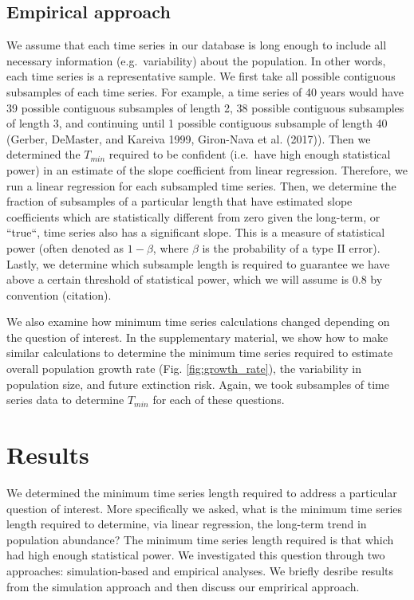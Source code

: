 \documentclass[12pt,]{article}
\begin{document}
\subsection{Empirical approach}\label{empirical-approach}

We assume that each time series in our database is long enough to
include all necessary information (e.g.~variability) about the
population. In other words, each time series is a representative sample.
We first take all possible contiguous subsamples of each time series.
For example, a time series of 40 years would have 39 possible contiguous
subsamples of length 2, 38 possible contiguous subsamples of length 3,
and continuing until 1 possible contiguous subsample of length 40
(Gerber, DeMaster, and Kareiva 1999, Giron-Nava et al. (2017)). Then we
determined the \(T_{min}\) required to be confident (i.e.~have high
enough statistical power) in an estimate of the slope coefficient from
linear regression. Therefore, we run a linear regression for each
subsampled time series. Then, we determine the fraction of subsamples of
a particular length that have estimated slope coefficients which are
statistically different from zero given the long-term, or ``true``, time
series also has a significant slope. This is a measure of statistical
power (often denoted as \(1- \beta\), where \(\beta\) is the probability
of a type II error). Lastly, we determine which subsample length is
required to guarantee we have above a certain threshold of statistical
power, which we will assume is 0.8 by convention (citation).

We also examine how minimum time series calculations changed depending
on the question of interest. In the supplementary material, we show how
to make similar calculations to determine the minimum time series
required to estimate overall population growth rate (Fig.
\ref{fig:growth_rate}), the variability in population size, and future
extinction risk. Again, we took subsamples of time series data to
determine \(T_{min}\) for each of these questions.

\section{Results}\label{results}

We determined the minimum time series length required to address a
particular question of interest. More specifically we asked, what is the
minimum time series length required to determine, via linear regression,
the long-term trend in population abundance? The minimum time series
length required is that which had high enough statistical power. We
investigated this question through two approaches: simulation-based and
empirical analyses. We briefly desribe results from the simulation
approach and then discuss our emprirical approach.
\end{document}
